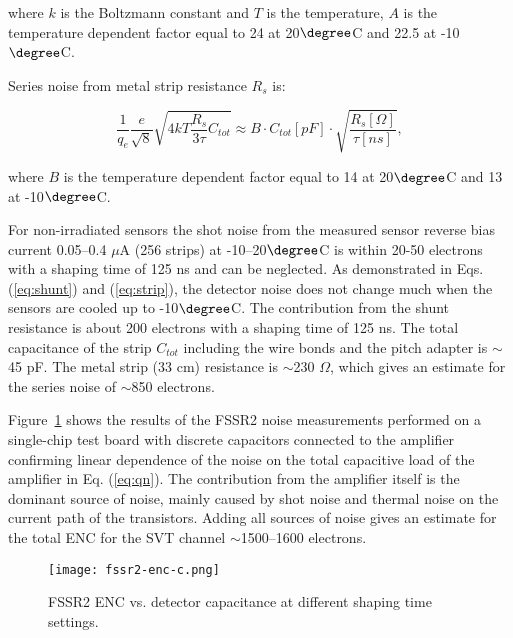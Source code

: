 where $k$ is the Boltzmann constant and $T$ is the temperature, $A$ is the temperature dependent factor equal to 24 at 20$\degree$C and 22.5 at -10$\degree$C.

Series noise from metal strip resistance $R_s$ is:

\begin{equation} \frac{1}{q_e}\frac{e}{\sqrt{8}}\sqrt{4kT\frac{R_s}{3\tau}C_{tot}} \approx B\cdot C_{tot}[pF]\cdot\sqrt{\frac{R_s[\Omega]}{\tau [ns]}} \label{eq:strip},
\end{equation}

where $B$ is the temperature dependent factor equal to 14 at 20$\degree$C and 13 at -10$\degree$C.

For non-irradiated sensors the shot noise from the measured sensor reverse bias current 0.05--0.4 $\mu$A (256 strips) at -10--20$\degree$C is within 20-50 electrons with a shaping time of 125 ns and can be neglected. As demonstrated in Eqs. (\ref{eq:shunt}) and (\ref{eq:strip}), the detector noise does not change much when the sensors are cooled up to -10$\degree$C. The contribution from the shunt resistance is about 200 electrons with a shaping time of 125 ns. The total capacitance of the strip $C_{tot}$ including the wire bonds and the pitch adapter is $\sim$45 pF. The metal strip (33 cm) resistance is $\sim$230 $\Omega$, which gives an estimate for the series noise of $\sim$850 electrons.

Figure~\ref{fig:fssr2-enc-c} shows the results of the FSSR2 noise measurements performed on a single-chip test board with discrete capacitors connected to the amplifier confirming linear dependence of the noise on the total capacitive load of the amplifier in Eq. (\ref{eq:qn}). The contribution from the amplifier itself is the dominant source of noise, mainly caused by shot noise and thermal noise on the current path of the transistors. Adding all sources of noise gives an estimate for the total ENC for the SVT channel $\sim$1500--1600 electrons.

\begin{figure}[hbt] 
\centering 
\texttt{[image: fssr2-enc-c.png]}
\caption{FSSR2 ENC vs. detector capacitance at different shaping time settings.}
\label{fig:fssr2-enc-c}
\end{figure}
